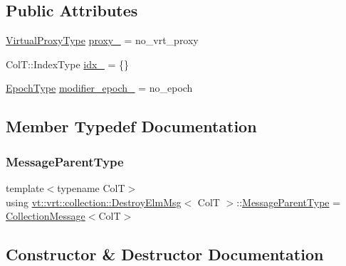\subsection*{Public Attributes}
\begin{DoxyCompactItemize}
\item 
\hyperlink{namespacevt_a1b417dd5d684f045bb58a0ede70045ac}{Virtual\+Proxy\+Type} \hyperlink{structvt_1_1vrt_1_1collection_1_1_destroy_elm_msg_aee568f34ec7d082546ef24868870a7aa}{proxy\+\_\+} = no\+\_\+vrt\+\_\+proxy
\item 
Col\+T\+::\+Index\+Type \hyperlink{structvt_1_1vrt_1_1collection_1_1_destroy_elm_msg_a84d402cc7f4957b333ea1dd2d4dd4a1d}{idx\+\_\+} = \{\}
\item 
\hyperlink{namespacevt_a81d11b28122d43bf9834577e4a06440f}{Epoch\+Type} \hyperlink{structvt_1_1vrt_1_1collection_1_1_destroy_elm_msg_a4614aa0e735c987973c4c790f2d060c2}{modifier\+\_\+epoch\+\_\+} = no\+\_\+epoch
\end{DoxyCompactItemize}


\subsection{Member Typedef Documentation}
\mbox{\label{structvt_1_1vrt_1_1collection_1_1_destroy_elm_msg_a4e24b2bce083d36d6fb448e37f40833b}} 
\subsubsection{\texorpdfstring{Message\+Parent\+Type}{MessageParentType}}
{\footnotesize\ttfamily template$<$typename ColT$>$ \\
using \hyperlink{structvt_1_1vrt_1_1collection_1_1_destroy_elm_msg}{vt\+::vrt\+::collection\+::\+Destroy\+Elm\+Msg}$<$ ColT $>$\+::\hyperlink{structvt_1_1location_1_1_entity_msg_a186637100a628eb04cb00127f5579210}{Message\+Parent\+Type} =  \hyperlink{structvt_1_1vrt_1_1collection_1_1_collection_message}{Collection\+Message}$<$ColT$>$}



\subsection{Constructor \& Destructor Documentation}
\mbox{\label{structvt_1_1vrt_1_1collection_1_1_destroy_elm_msg_a2bf33cf7e0b6327724ecab2ac97774b4}} 
